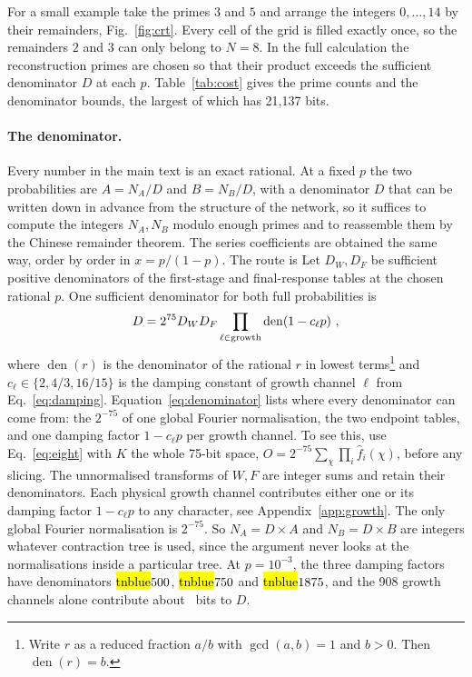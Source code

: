 For a small example take the primes $3$ and $5$ and arrange the integers $0,\dots,14$ by their remainders, Fig.~\ref{fig:crt}. Every cell of the grid is filled exactly once, so the remainders $2$ and $3$ can only belong to $N=8$. 
In the full calculation the reconstruction primes are chosen so that their product exceeds the sufficient denominator $D$ at each $p$. Table~\ref{tab:cost} gives the prime counts and the denominator bounds, the largest of which has 21,137 bits.

\paragraph{The denominator.} 
Every number in the main text is an exact rational. At a fixed $p$ the two probabilities are $A=N_A/D$ and $B=N_B/D$, with a denominator $D$ that can be written down in advance from the structure of the network, so it suffices to compute the integers $N_A,N_B$ modulo enough primes and to reassemble them by the Chinese remainder theorem. The series coefficients are obtained the same way, order by order in $x=p/(1-p)$. The route is
Let $D_W,D_F$ be sufficient positive denominators of the first-stage and final-response tables at the chosen rational $p$. One sufficient denominator for both full probabilities is
\begin{equation}
 D=2^{75}D_WD_F\prod_{\ell\in{\rm growth}}\operatorname{den}(1-c_\ell p) \ ,
 \label{eq:denominator}
\end{equation}
where $\operatorname{den}(r)$ is the denominator of the rational $r$ in lowest terms\footnote{Write $r$ as a reduced fraction $a/b$ with $\gcd(a,b)=1$ and $b>0$. Then $\operatorname{den}(r)=b$.} and $c_\ell\in\{2,4/3,16/15\}$ is the damping constant of growth channel $\ell$ from Eq.~\eqref{eq:damping}.
Equation~\eqref{eq:denominator} lists where every denominator can come from: the $2^{-75}$ of one global Fourier normalisation, the two endpoint tables, and one damping factor $1-c_\ell p$ per growth channel. 
To see this, use Eq.~\eqref{eq:eight} with $K$ the whole 75-bit space, $O=2^{-75}\sum_\chi\prod_i\hat f_i(\chi)$, before any slicing.
The unnormalised transforms of $W,F$ are integer sums and retain their denominators. 
Each physical growth channel contributes either one or its damping factor $1-c_\ell p$ to any character, see Appendix~\ref{app:growth}. 
The only global Fourier normalisation is $2^{-75}$. 
So $N_A = D\times A$ and $N_B = D\times B$ are integers whatever contraction tree is used, since the argument never looks at the normalisations inside a particular tree.
At $p=10^{-3}$, the three damping factors have denominators \hl{tnblue}{$500$}, \hl{tnblue}{$750$} and \hl{tnblue}{$1875$}, and the 908 growth channels alone contribute about \growthbits\ bits to $D$. 

